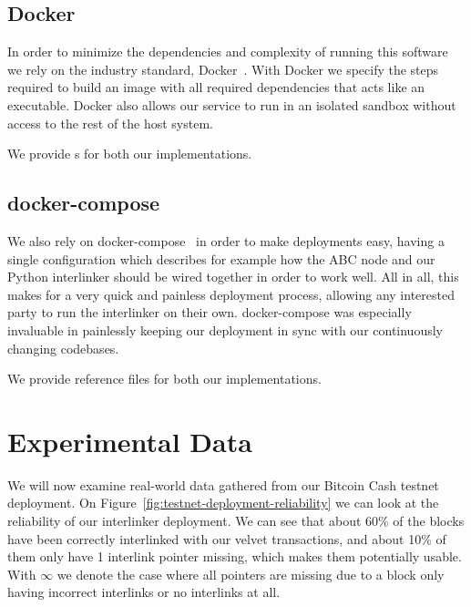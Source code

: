 \subsection{Docker}

In order to minimize the dependencies and complexity of running this software we rely on the industry standard, Docker~\cite{docker}. With Docker we specify the steps required to build an image with all required dependencies that acts like an executable. Docker also allows our service to run in an isolated sandbox without access to the rest of the host system.

We provide s for both our implementations.

\subsection{docker-compose}

We also rely on docker-compose~\cite{docker-compose} in order to make deployments easy, having a single configuration which describes for example how the ABC node and our Python interlinker should be wired together in order to work well. All in all, this makes for a very quick and painless deployment process, allowing any interested party to run the interlinker on their own. docker-compose was especially invaluable in painlessly keeping our deployment in sync with our continuously changing codebases.

We provide reference  files for both our implementations.

\section{Experimental Data}

We will now examine real-world data gathered from our Bitcoin Cash testnet deployment. On Figure~\ref{fig:testnet-deployment-reliability} we can look at the reliability of our interlinker deployment. We can see that about 60\% of the blocks have been correctly interlinked with our velvet transactions, and about 10\% of them only have 1 interlink pointer missing, which makes them potentially usable. With $\infty$ we denote the case where all pointers are missing due to a block only having incorrect interlinks or no interlinks at all.


